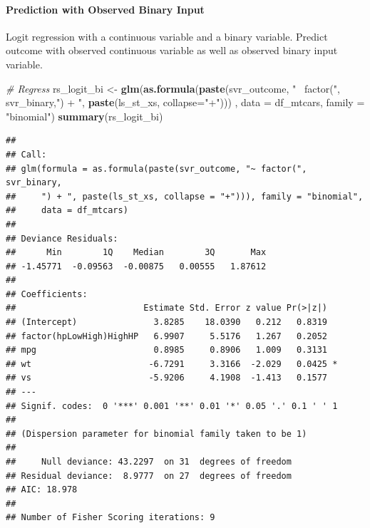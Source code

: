 \documentclass[
]{book}
\newenvironment{Shaded}{\begin{snugshade}}{\end{snugshade}}
\newcommand{\CommentTok}[1]{\textcolor[rgb]{0.56,0.35,0.01}{\textit{#1}}}
\newcommand{\DataTypeTok}[1]{\textcolor[rgb]{0.13,0.29,0.53}{#1}}
\newcommand{\KeywordTok}[1]{\textcolor[rgb]{0.13,0.29,0.53}{\textbf{#1}}}
\newcommand{\NormalTok}[1]{#1}
\newcommand{\OperatorTok}[1]{\textcolor[rgb]{0.81,0.36,0.00}{\textbf{#1}}}
\newcommand{\StringTok}[1]{\textcolor[rgb]{0.31,0.60,0.02}{#1}}
\begin{document}
\begin{Shaded}
\end{Shaded}

\hypertarget{prediction-with-observed-binary-input}{%
\paragraph{Prediction with Observed Binary Input}\label{prediction-with-observed-binary-input}}

Logit regression with a continuous variable and a binary variable. Predict outcome with observed continuous variable as well as observed binary input variable.

\begin{Shaded}
\begin{Highlighting}[]
\CommentTok{# Regress}
\NormalTok{rs_logit_bi <-}\StringTok{ }\KeywordTok{glm}\NormalTok{(}\KeywordTok{as.formula}\NormalTok{(}\KeywordTok{paste}\NormalTok{(svr_outcome,}
                                    \StringTok{"~ factor("}\NormalTok{, svr_binary,}\StringTok{") + "}\NormalTok{,}
                                    \KeywordTok{paste}\NormalTok{(ls_st_xs, }\DataTypeTok{collapse=}\StringTok{"+"}\NormalTok{)))}
\NormalTok{                   , }\DataTypeTok{data =}\NormalTok{ df_mtcars, }\DataTypeTok{family =} \StringTok{"binomial"}\NormalTok{)}
\KeywordTok{summary}\NormalTok{(rs_logit_bi)}
\end{Highlighting}
\end{Shaded}

\begin{verbatim}
## 
## Call:
## glm(formula = as.formula(paste(svr_outcome, "~ factor(", svr_binary, 
##     ") + ", paste(ls_st_xs, collapse = "+"))), family = "binomial", 
##     data = df_mtcars)
## 
## Deviance Residuals: 
##      Min        1Q    Median        3Q       Max  
## -1.45771  -0.09563  -0.00875   0.00555   1.87612  
## 
## Coefficients:
##                         Estimate Std. Error z value Pr(>|z|)  
## (Intercept)               3.8285    18.0390   0.212   0.8319  
## factor(hpLowHigh)HighHP   6.9907     5.5176   1.267   0.2052  
## mpg                       0.8985     0.8906   1.009   0.3131  
## wt                       -6.7291     3.3166  -2.029   0.0425 *
## vs                       -5.9206     4.1908  -1.413   0.1577  
## ---
## Signif. codes:  0 '***' 0.001 '**' 0.01 '*' 0.05 '.' 0.1 ' ' 1
## 
## (Dispersion parameter for binomial family taken to be 1)
## 
##     Null deviance: 43.2297  on 31  degrees of freedom
## Residual deviance:  8.9777  on 27  degrees of freedom
## AIC: 18.978
## 
## Number of Fisher Scoring iterations: 9
\end{verbatim}
\end{document}
